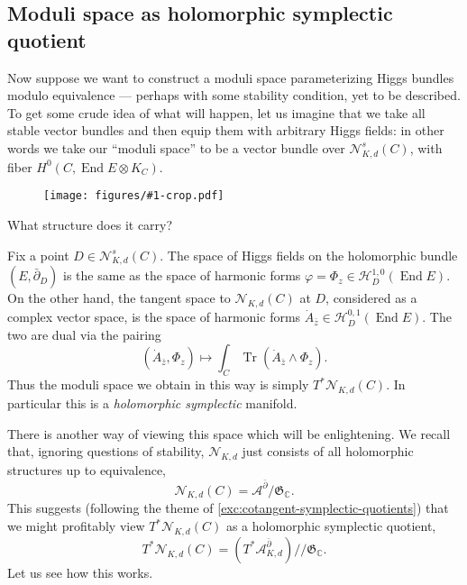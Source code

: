 \documentclass[12pt,letterpaper,reqno]{article}
\numberwithin{equation}{section}
\newcommand{\fG}{{\mathfrak G}}
\newcommand{\cN}{\ensuremath{\mathcal N}}
\newcommand{\cH}{\ensuremath{\mathcal H}}
\newcommand{\cA}{\ensuremath{\mathcal A}}
\newcommand{\C}{\ensuremath{\mathbb C}}
\newcommand{\kq}{/\!\!/}
\newcommand{\ti}[1]{\textit{#1}}
\DeclareMathOperator{\Tr}{Tr}
\DeclareMathOperator{\End}{End}
\newcommand{\insfig}[2]{\begin{figure}[htbp] \centering \texttt{[image: figures/\#1-crop.pdf]} \label{fig:#1} \end{figure}}
\begin{document}
\subsection{Moduli space as holomorphic symplectic quotient}

Now suppose we want to construct a moduli space parameterizing Higgs
bundles modulo equivalence --- perhaps with some stability condition,
yet to be described. To get some crude idea of what will happen,
let us imagine that we take all stable vector bundles
and then equip them with arbitrary Higgs fields: in other words
we take our ``moduli space'' to be a vector bundle over 
$\cN^s_{K,d}(C)$, with fiber $H^0(C, \End E \otimes K_C)$.

\insfig{higgs-bundles-16}{1.0}

What structure does it carry?

Fix a point $D \in \cN^s_{K,d}(C)$.
The space of Higgs fields on the holomorphic bundle $(E, \bar\partial_D)$
is the same as the space of harmonic forms
$\varphi = \Phi_z \in \cH^{1,0}_D(\End E)$.
On the other hand, the tangent space to $\cN_{K,d}(C)$ at $D$, considered
as a complex vector space, is the space
of harmonic forms $\dot{A}_{\bar z} \in \cH^{0,1}_D(\End E)$.
The two are dual via the pairing
\begin{equation}
  (\dot{A}_{\bar z}, \Phi_z) \mapsto \int_C \Tr (\dot{A}_{\bar z} \wedge \Phi_z).
\end{equation}
Thus the moduli space we obtain in this way is simply $T^* \cN_{K,d}(C)$.
In particular this is a \ti{holomorphic symplectic} manifold.

There is another way of viewing this space which will be enlightening.
We recall that, ignoring questions of stability, $\cN_{K,d}$ just
consists of all holomorphic structures up to equivalence,
\begin{equation}
	\cN_{K,d}(C) = \cA^{\bar\partial} / \fG_\C.
\end{equation}
This suggests 
(following the theme of \autoref{exc:cotangent-symplectic-quotients}) that we might profitably view $T^* \cN_{K,d}(C)$
as a holomorphic symplectic quotient,
\begin{equation}
	T^* \cN_{K,d}(C) = (T^* \cA^{\bar\partial}_{K,d}) \kq \fG_\C.
\end{equation}
Let us see how this works.
\end{document}
